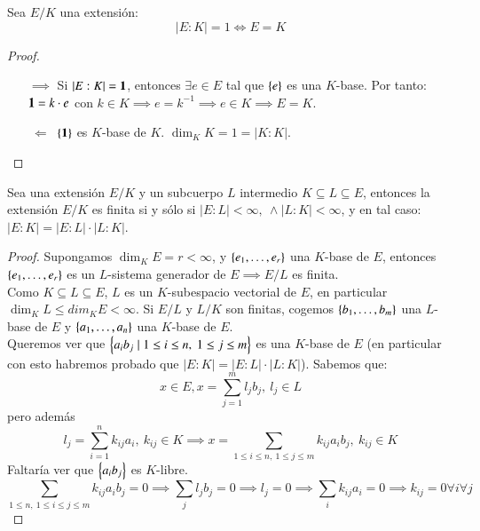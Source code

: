 \begin{lm}
    Sea $E/K$ una extensión:
    $$
        |E:K| = 1 \iff E = K
    $$
\end{lm}

\begin{proof}$ $
    \begin{itemize}
        \item[$\implies$] Si $|E:K| = \mathbf{1}$, entonces $\exists e \in E$ tal que $\left\{e\right\}$ es una $K$-base. Por tanto: $\mathbf{1} = k \cdot e$ con $k \in K \implies e = k^{-1} \implies e \in K \implies E = K$.
        \item[$\ \Longleftarrow \ $] $\left\{\mathbf{1}\right\}$ es $K$-base de $K$. $\dim_K K = 1 = |K:K|$.
    \end{itemize}
\end{proof}

\begin{thm}\label{thm:transgr}\label{thm:2.1}%
    Sea una extensión $E/K$ y un subcuerpo $L$ intermedio $K \subseteq L \subseteq E$, entonces la extensión $E/K$ es finita si y sólo si $|E:L| < \infty,\ \land |L:K| < \infty$, y en tal caso: $|E:K| = |E:L|\cdot |L:K|$.
\end{thm}

\begin{proof}
    Supongamos $\dim_K E = r < \infty$, y $\left\{e_1, \ldots, e_r\right\}$ una $K$-base de $E$, entonces $\left\{e_1, \ldots, e_r\right\}$ es un $L$-sistema generador de $E \implies E/L$ es finita.\\
    Como $K \subseteq L \subseteq E$, $L$ es un $K$-subespacio vectorial de $E$, en particular $\dim_K L \leq dim_K E < \infty$. Si $E/L$ y $L/K$ son finitas, cogemos $\left\{b_1, \ldots, b_m\right\}$ una $L$-base de $E$ y $\left\{a_1, \ldots, a_n\right\}$ una $K$-base de $E$.\\
    Queremos ver que $\left\{a_ib_j \mid 1 \leq i \leq n,\ 1 \leq j \leq m\right\}$ es una $K$-base de $E$ (en particular con esto habremos probado que $|E:K| = |E:L|\cdot |L:K|$). Sabemos que:
    $$
        x \in E, x = \sum_{j=1}^m l_j b_j,\ l_j \in L
    $$
    pero además
    $$
        l_j = \sum_{i = 1}^{n} k_{ij} a_i,\ k_{ij} \in K \implies x = \sum_{1 \leq i \leq n,\ 1 \leq j \leq m} k_{ij}a_ib_j,\ k_{ij} \in K
    $$
    Faltaría ver que $\left\{a_ib_j\right\}$ es $K$-libre.
    $$
        \sum_{1 \leq n,\ 1 \leq i\leq j \leq m} k_{ij}a_ib_j = 0 \implies \sum_j l_j b_j = 0 \implies l_j = 0 \implies \sum_i k_{ij}a_i = 0 \implies k_{ij} = 0 \forall i \forall j
    $$
\end{proof}

